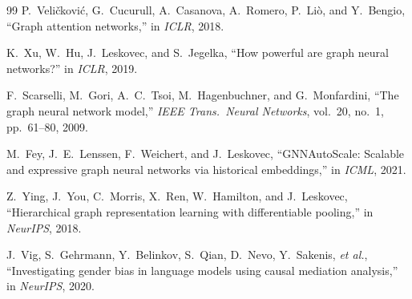 \documentclass[11pt,a4paper]{article}
\begin{document}
\begin{thebibliography}{99}
P.~Veli\v{c}kovi\'{c}, G.~Cucurull, A.~Casanova, A.~Romero, P.~Li\`{o}, and Y.~Bengio,
``Graph attention networks,''
in \textit{ICLR}, 2018.

K.~Xu, W.~Hu, J.~Leskovec, and S.~Jegelka,
``How powerful are graph neural networks?''
in \textit{ICLR}, 2019.

F.~Scarselli, M.~Gori, A.~C.~Tsoi, M.~Hagenbuchner, and G.~Monfardini,
``The graph neural network model,''
\textit{IEEE Trans.\ Neural Networks}, vol.~20, no.~1, pp.~61--80, 2009.

M.~Fey, J.~E.~Lenssen, F.~Weichert, and J.~Leskovec,
``GNNAutoScale: Scalable and expressive graph neural networks via historical embeddings,''
in \textit{ICML}, 2021.

Z.~Ying, J.~You, C.~Morris, X.~Ren, W.~Hamilton, and J.~Leskovec,
``Hierarchical graph representation learning with differentiable pooling,''
in \textit{NeurIPS}, 2018.

J.~Vig, S.~Gehrmann, Y.~Belinkov, S.~Qian, D.~Nevo, Y.~Sakenis, \emph{et al.},
``Investigating gender bias in language models using causal mediation analysis,''
in \textit{NeurIPS}, 2020.

\end{thebibliography}
\end{document}
